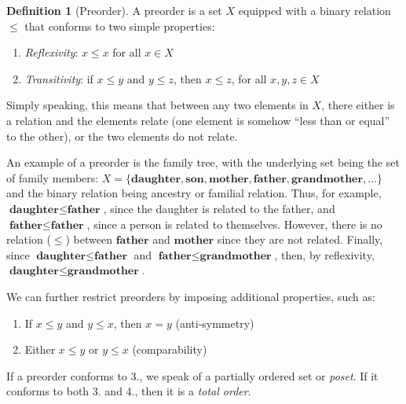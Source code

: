 \documentclass[
]{book}
\providecommand{\tightlist}{%
  \setlength{\itemsep}{0pt}\setlength{\parskip}{0pt}}
\theoremstyle{definition}
\newtheorem{definition}{Definition}[chapter]
\theoremstyle{definition}
\theoremstyle{definition}
\theoremstyle{definition}
\theoremstyle{remark}
\begin{document}
\begin{definition}[Preorder]

A preorder is a set \(X\) equipped with a binary relation \(\leq\) that conforms to two simple properties:

\begin{enumerate}
\def\labelenumi{\arabic{enumi}.}
\tightlist
\item
  \emph{Reflexivity}: \(x \leq x\) for all \(x \in X\)
\item
  \emph{Transitivity}: if \(x \leq y\) and \(y \leq z\), then \(x \leq z\), for all \(x, y, z \in X\)
\end{enumerate}

\end{definition}

Simply speaking, this means that between any two elements in \(X\), there either is a relation and the elements relate (one element is somehow ``less than or equal'' to the other), or the two elements do not relate.

An example of a preorder is the family tree, with the underlying set being the set of family members: \(X = \{ \textbf{daughter}, \textbf{son}, \textbf{mother}, \textbf{father}, \textbf{grandmother}, ... \}\) and the binary relation being ancestry or familial relation. Thus, for example, \(\textbf{daughter} \leq \textbf{father}\), since the daughter is related to the father, and \(\textbf{father} \leq \textbf{father}\), since a person is related to themselves. However, there is no relation (\(\leq\)) between \(\textbf{father}\) and \(\textbf{mother}\) since they are not related. Finally, since \(\textbf{daughter} \leq \textbf{father}\) and \(\textbf{father} \leq \textbf{grandmother}\), then, by reflexivity, \(\textbf{daughter} \leq \textbf{grandmother}\).

We can further restrict preorders by imposing additional properties, such as:

\begin{enumerate}
\def\labelenumi{\arabic{enumi}.}
\setcounter{enumi}{2}
\tightlist
\item
  If \(x \leq y\) and \(y \leq x\), then \(x = y\) (anti-symmetry)
\item
  Either \(x \leq y\) or \(y \leq x\) (comparability)
\end{enumerate}

If a preorder conforms to 3., we speak of a partially ordered set or \emph{poset}. If it conforms to both 3. and 4., then it is a \emph{total order}.
\end{document}
